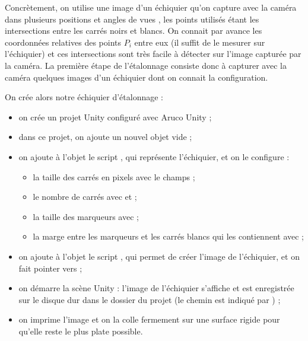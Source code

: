 Concrètement, on utilise une image d'un échiquier qu'on capture avec la caméra dans plusieurs positions et angles de vues , les points utilisés étant les intersections entre les carrés noirs et blancs. On connait par avance les coordonnées relatives des points $P_i$ entre eux (il suffit de le mesurer sur l'échiquier) et ces intersections sont très facile à détecter sur l'image capturée par la caméra. La première étape de l'étalonnage consiste donc à capturer avec la caméra quelques images d'un échiquier dont on connait la configuration.


On crée alors notre échiquier d'étalonnage  :
\begin{itemize}
  \item on crée un projet Unity configuré avec Aruco Unity  ;
  \item dans ce projet, on ajoute un nouvel objet vide ;
  \item on ajoute à l'objet le script , qui représente l'échiquier, et on le configure :
  \begin{itemize}
    \item la taille des carrés en pixels avec le champs  ;
    \item le nombre de carrés avec  et  ;
    \item la taille des marqueurs avec  ;
    \item la marge entre les marqueurs et les carrés blancs qui les contiennent avec  ;
  \end{itemize}
  \item on ajoute à l'objet le script , qui permet de créer l'image de l'échiquier, et on fait pointer  vers  ;
  \item on démarre la scène Unity : l'image de l'échiquier s'affiche et est enregistrée sur le disque dur dans le dossier du projet (le chemin est indiqué par ) ;
  \item on imprime l'image et on la colle fermement sur une surface rigide pour qu'elle reste le plus plate possible.
\end{itemize}  


